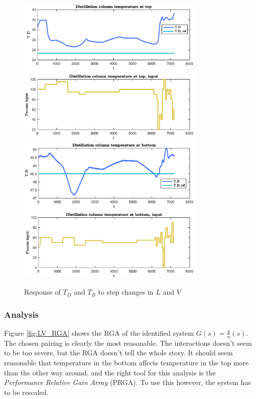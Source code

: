 \documentclass[12pt]{article}
\begin{document}
\begin{figure}[p]
\centering
\includegraphics[width=0.8\textwidth]{../Systemanalyse/Log_Data_to_Matlab/Figurer/LV_identifisering/T_D_eksperiment.eps}
\includegraphics[width=0.8\textwidth]{../Systemanalyse/Log_Data_to_Matlab/Figurer/LV_identifisering/T_B_eksperiment.eps}
\caption{Response of $T_D$ and $T_B $ to step changes in $L$ and $V$}
\label{fig:LV_experiment}
\end{figure}

\subsubsection{Analysis}
Figure \ref{fig:LV_RGA} shows the RGA of the identified system $G(s) = \frac{y}{u}(s)$. The chosen pairing is clearly the most reasonable. The interactions doesn't seem to be too severe, but the RGA doesn't tell the whole story. It should seem reasonable that temperature in the bottom affects temperature in the top more than the other way around, and the right tool for this analysis is the \textit{Performance Relative Gain Array} (PRGA). To use this however, the system has to be rescaled.
\end{document}
